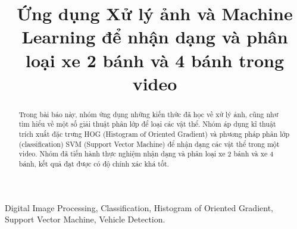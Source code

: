 \documentclass[10pt,conference,a4paper]{IEEEtran}
\begin{document}
\columnsep=0.63cm
\def\mathbi#1{\boldsymbol{#1}}
\def\erfc{\:\mathrm{erfc}}
\def\arg{\:\mathrm{arg}}
\def\E{\:\mathrm{E}}
\def\sinc{\:\mathrm{sinc}}
\def\T{\mathrm{T}}
\def\H{\mathrm{H}}
\newcommand{\bigsize}{\fontsize{16pt}{20pt}\selectfont}

%


\title{Ứng dụng Xử lý ảnh và Machine Learning để nhận dạng và phân loại xe 2 bánh và 4 bánh trong video }

\author{
}
\maketitle


\begin{abstract}
Trong bài báo này, nhóm ứng dụng những kiến thức đã học về xử lý ảnh, cũng như tìm hiểu về một số giải thuật phân lớp để loại các vật thể. Nhóm áp dụng kĩ thuật trích xuất đặc trưng HOG (Histogram of Oriented Gradient) và phương pháp phân lớp (classification)  SVM (Support Vector Machine) để  nhận dạng các vật thể trong một video. Nhóm đã tiến hành thực nghiệm nhận dạng và phân loại xe 2 bánh và xe 4 bánh, kết quả đạt được có độ chính xác khá tốt.
	 
\end{abstract}

\begin{IEEEkeywords}
Digital Image Processing, Classification, Histogram of Oriented Gradient, Support Vector Machine, Vehicle Detection.
\end{IEEEkeywords}
\IEEEpeerreviewmaketitle
%
\end{document}
